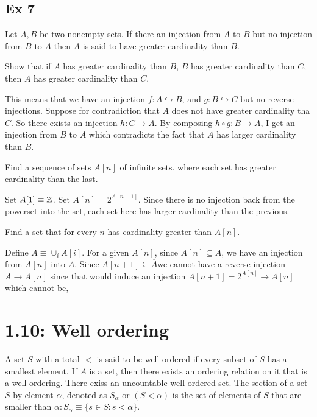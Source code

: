 \documentclass{article}
\begin{document}
\subsection{Ex 7}
Let $A, B$ be two nonempty sets. If there an injection from $A$ to $B$ but no injection from $B$ to $A$ then $A$ is said to have greater cardinality than $B$.

 Show that if $A$ has greater cardinality than $B$, $B$ has greater cardinality than $C$, then $A$ has greater cardinality than $C$.

\answer This means that we have an injection $f: A \hookrightarrow B$, and $g: B \hookrightarrow C$ but no reverse injections. Suppose for
contradiction that $A$ does not have greater cardinality tha $C$. So there exists an injection $h: C \rightarrow A$. By composing $h \circ g: B \rightarrow A$,
I get an injection from $B$ to $A$ which contradicts the fact that $A$ has larger cardinality than $B$.

 Find a sequence of sets $A[n]$ of infinite sets. where each set has greater cardinality than the last.

\answer Set $A[1] \equiv \mathbb Z$. Set $A[n] = 2^{A[n-1]}$. Since there is no injection back from the powerset into the set, each set here has larger cardinality than the previous.

 Find a set that for every $n$ has cardinality greater than $A[n]$.

Define $\overline A \equiv \cup_i A[i]$. For a given $A[n]$, since $A[n] \subseteq \overline A$,
we have an injection from $A[n]$ into $A$. Since 
$A[n+1] \subseteq \overline A$we cannot have a reverse
injection $\overline A \rightarrow A[n]$ since that would
induce an injection $\overline A[n+1] = 2^{A[n]} \rightarrow A[n]$ which cannot be,



\section{1.10: Well ordering}
 A set $S$ with a total $<$ is said to be well ordered if every subset of $S$ has a smallest element.
 If $A$ is a set, then there exists an ordering relation on it that is a well ordering.
 There exiss an uncountable well ordered set.
 The section of a set $S$ by element $\alpha$, denoted as $S_\alpha$ or $(S < \alpha)$ is the set of elements of $S$ that
are smaller than $\alpha: S_\alpha \equiv \{ s \in S : s < \alpha \}$.
\end{document}
